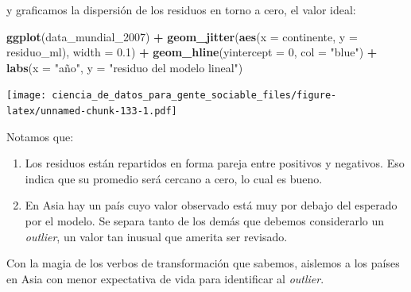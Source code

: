 \documentclass[spanish,]{book}
\newenvironment{Shaded}{\begin{snugshade}}{\end{snugshade}}
\newcommand{\DataTypeTok}[1]{\textcolor[rgb]{0.13,0.29,0.53}{#1}}
\newcommand{\DecValTok}[1]{\textcolor[rgb]{0.00,0.00,0.81}{#1}}
\newcommand{\FloatTok}[1]{\textcolor[rgb]{0.00,0.00,0.81}{#1}}
\newcommand{\KeywordTok}[1]{\textcolor[rgb]{0.13,0.29,0.53}{\textbf{#1}}}
\newcommand{\NormalTok}[1]{#1}
\newcommand{\OperatorTok}[1]{\textcolor[rgb]{0.81,0.36,0.00}{\textbf{#1}}}
\newcommand{\StringTok}[1]{\textcolor[rgb]{0.31,0.60,0.02}{#1}}
\providecommand{\tightlist}{%
  \setlength{\itemsep}{0pt}\setlength{\parskip}{0pt}}
\begin{document}
y graficamos la dispersión de los residuos en torno a cero, el valor ideal:

\begin{Shaded}
\begin{Highlighting}[]
\KeywordTok{ggplot}\NormalTok{(data_mundial_}\DecValTok{2007}\NormalTok{) }\OperatorTok{+}
\StringTok{    }\KeywordTok{geom_jitter}\NormalTok{(}\KeywordTok{aes}\NormalTok{(}\DataTypeTok{x =}\NormalTok{ continente, }\DataTypeTok{y =}\NormalTok{ residuo_ml), }\DataTypeTok{width =} \FloatTok{0.1}\NormalTok{) }\OperatorTok{+}
\StringTok{    }\KeywordTok{geom_hline}\NormalTok{(}\DataTypeTok{yintercept =} \DecValTok{0}\NormalTok{, }\DataTypeTok{col =} \StringTok{"blue"}\NormalTok{) }\OperatorTok{+}
\StringTok{    }\KeywordTok{labs}\NormalTok{(}\DataTypeTok{x =} \StringTok{"año"}\NormalTok{, }\DataTypeTok{y =} \StringTok{"residuo del modelo lineal"}\NormalTok{)}
\end{Highlighting}
\end{Shaded}

\texttt{[image: ciencia\_de\_datos\_para\_gente\_sociable\_files/figure-latex/unnamed-chunk-133-1.pdf]}

Notamos que:

\begin{enumerate}
\def\labelenumi{\arabic{enumi}.}
\tightlist
\item
  Los residuos están repartidos en forma pareja entre positivos y negativos. Eso indica que su promedio será cercano a cero, lo cual es bueno.
\item
  En Asia hay un país cuyo valor observado está muy por debajo del esperado por el modelo. Se separa tanto de los demás que debemos considerarlo un \emph{outlier}, un valor tan inusual que amerita ser revisado.
\end{enumerate}

Con la magia de los verbos de transformación que sabemos, aislemos a los países en Asia con menor expectativa de vida para identificar al \emph{outlier}.

\begin{Shaded}
\end{Shaded}
\end{document}
